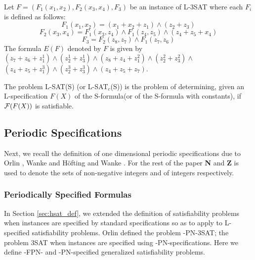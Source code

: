 \begin{example}
Let $F= (F_1(x_1,x_2),F_{2}(x_3,x_4), F_3)$
be an instance of {\sf L-3SAT} where each $F_i$ is defined as follows:
\[F_1(x_1,x_2) = (x_1 + x_2 + z_1) \wedge (z_2 + z_3) \]
\[F_2(x_3,x_4) = F_1(x_3, z_4) \wedge F_1(z_4, z_5) \wedge
                               (z_4 + z_5 + x_4)   \]
\[F_3 = F_2(z_8,z_7) \wedge  F_1(z_7,z_6) \]
The formula $E(F)$ denoted by $F$ is given by 
$ (z_7 + z_6 + z_1^1) \wedge (z_2^1 + z_3^1) \wedge
(z_8 + z_4 + z_1^2) \wedge (z_2^2 + z_3^2) \wedge $
$(z_4 + z_5 + z_1^3) \wedge (z_2^3 + z_3^3) \wedge (z_4 + z_5 + z_7)$. 

\end{example}


\begin{definition}
The problem {\sf L-SAT(S)} (or {\sf L-SAT}$_c${\sf (S)}) is the
problem of determining, given an L-specification $F(X)$ of the S-formula(or of
the S-formula with constants), if ${\cal F}(F(X))$ is satisfiable.
\end{definition}
 






\subsection{Periodic Specifications }\label{sec:fpn_spec}
Next, we recall the definition of one dimensional periodic specifications 
due to  Orlin \cite{Or82a}, Wanke \cite{Wa93} and 
H\"ofting and Wanke \cite{HW92}. 
For the rest of the paper {\bf N} and {\bf Z} is used to 
denote the sets of non-negative integers and of integers respectively.



\subsubsection{Periodically Specified Formulas}
In Section \ref{sec:hsat_def}, we extended
the definition of satisfiability problems when instances are specified
by standard specifications so as to apply to 
{\sf L}-specified satisfiability problems. Orlin \cite{Or82a} 
defined the problem {-PN-3SAT}; the problem {\sf 3SAT} when 
instances are specified using {-PN}-specifications.
Here we define {-FPN}- and {-PN}-specified generalized satisfiability
problems.




